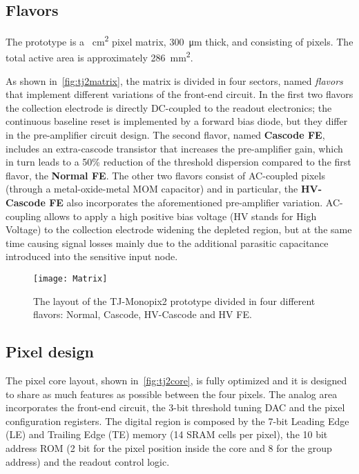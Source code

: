 
\subsection{Flavors} \label{sec:flavors}

The prototype is a ~\unit{cm^{2}} pixel matrix, \SI{300}{\micro m} thick, and consisting of  pixels. The total active area is approximately \SI{286}{mm^{2}}.


As shown in~\autoref{fig:tj2matrix}, the matrix is divided in four sectors, named \textit{flavors} that implement different variations of the front-end circuit. In the first two flavors the collection electrode is directly DC-coupled to the readout electronics;  the continuous baseline reset is implemented by a forward bias diode, but they differ in the pre-amplifier circuit design. The second flavor, named \textbf{Cascode FE}, includes an extra-cascode transistor that increases the pre-amplifier gain, which in turn leads to a 50\% reduction of the threshold dispersion compared to the first flavor, the \textbf{Normal FE}. The other two flavors consist of AC-coupled pixels (through a metal-oxide-metal MOM capacitor) and in particular, the \textbf{HV-Cascode FE} also incorporates the aforementioned pre-amplifier variation. AC-coupling allows to apply a high positive bias voltage (HV stands for High Voltage) to the collection electrode widening the depleted region, but at the same time causing signal losses mainly due to the additional parasitic capacitance introduced into the sensitive input node.\\


\begin{figure}[h!]
\centering
\texttt{[image: Matrix]}
\caption{The layout of the TJ-Monopix2 prototype divided in four different flavors: Normal, Cascode, HV-Cascode and HV FE.}
\label{fig:tj2matrix}
\end{figure}



\subsection{Pixel design}\label{sec:improved_circuit}

The  pixel core layout, shown in~\autoref{fig:tj2core}, is fully optimized and it is designed to share as much features as possible between the four pixels. The analog area incorporates the front-end circuit, the 3-bit threshold tuning DAC and the pixel configuration registers. The digital region is composed by the 7-bit Leading Edge (LE) and Trailing Edge (TE) memory (14 SRAM cells per pixel), the 10 bit address ROM (2 bit for the pixel position inside the core and 8 for the group address) and the readout control logic. 

